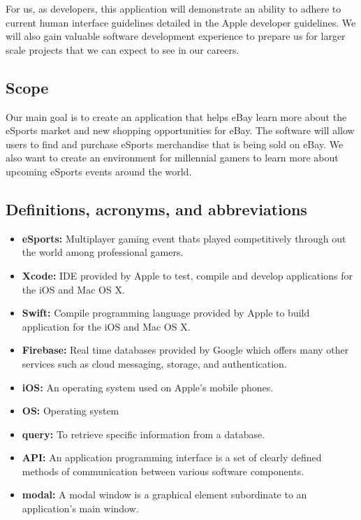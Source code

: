 \documentclass[onecolumn, draftclsnofoot,10pt, compsoc]{IEEEtran}
\begin{document}
\par For us, as developers, this application will demonstrate an ability to adhere to current human interface guidelines detailed in the Apple developer guidelines. We will also gain valuable software development experience to prepare us for larger scale projects that we can expect to see in our careers.

\subsection{Scope}
Our main goal is to create an application that helps eBay learn more about the eSports market and new shopping opportunities for eBay. The software will allow users to find and purchase eSports merchandise that is being sold on eBay. We also want to create an environment for millennial gamers to learn more about upcoming eSports events around the world. 

\subsection{Definitions, acronyms, and abbreviations}

\begin{itemize}
\item \textbf{eSports:} Multiplayer gaming event thats played competitively through out the world among professional gamers.
\item \textbf{Xcode:} IDE provided by Apple to test, compile and develop applications for the iOS and Mac OS X.
\item \textbf{Swift: } Compile programming language provided by Apple to build application for the iOS and Mac OS X.
\item \textbf{Firebase: } Real time databases provided by Google which offers many other services such as cloud messaging, storage, and authentication.
\item \textbf{iOS:} An operating system used on Apple's mobile phones.
\item \textbf{OS:} Operating system
\item \textbf{query:} To retrieve specific information from a database.
\item \textbf{API:} An application programming interface is a set of clearly defined methods of communication between various software components.
\item \textbf{modal:} A modal window is a graphical element subordinate to an application's main window.

\end{itemize}
\end{document}
